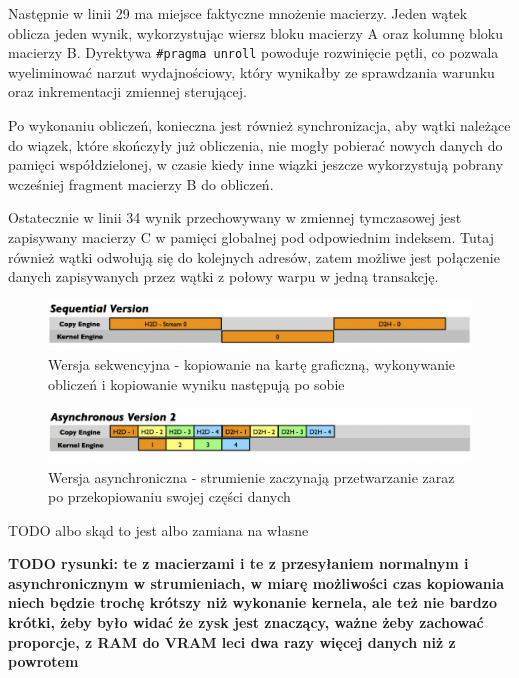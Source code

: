 \documentclass[12pt,a4paper]{article}
\begin{document}
Następnie w linii 29 ma miejsce faktyczne mnożenie macierzy. Jeden wątek oblicza jeden wynik, wykorzystując wiersz bloku macierzy A oraz kolumnę bloku macierzy B. Dyrektywa \verb|#pragma unroll| powoduje rozwinięcie pętli, co pozwala wyeliminować narzut wydajnościowy, który wynikałby ze sprawdzania warunku oraz inkrementacji zmiennej sterującej.

Po wykonaniu obliczeń, konieczna jest również synchronizacja, aby wątki należące do wiązek, które skończyły już obliczenia, nie mogły pobierać nowych danych do pamięci współdzielonej, w czasie kiedy inne wiązki jeszcze wykorzystują pobrany wcześniej fragment macierzy B do obliczeń.

Ostatecznie w linii 34 wynik przechowywany w zmiennej tymczasowej jest zapisywany macierzy C w pamięci globalnej pod odpowiednim indeksem. Tutaj również wątki odwołują się do kolejnych adresów, zatem możliwe jest połączenie danych zapisywanych przez wątki z połowy warpu w jedną transakcję.\\

\begin{figure}
  \includegraphics[width=\linewidth]{images/seq_version.jpg}
  \caption{Wersja sekwencyjna - kopiowanie na kartę graficzną, wykonywanie obliczeń i kopiowanie wyniku następują po sobie}
  \label{fig:seq}
\end{figure}

\begin{figure}
  \includegraphics[width=\linewidth]{images/async_version.jpg}
  \caption{Wersja asynchroniczna - strumienie zaczynają przetwarzanie zaraz po przekopiowaniu swojej części danych}
  \label{fig:async}
\end{figure}

TODO albo skąd to jest albo zamiana na własne

\textbf{TODO rysunki: te z macierzami i te z przesyłaniem normalnym i asynchronicznym w strumieniach, w miarę możliwości czas kopiowania niech będzie trochę krótszy niż wykonanie kernela, ale też nie bardzo krótki, żeby było widać że zysk jest znaczący, ważne żeby zachować proporcje, z RAM do VRAM leci dwa razy więcej danych niż z powrotem}
\end{document}

